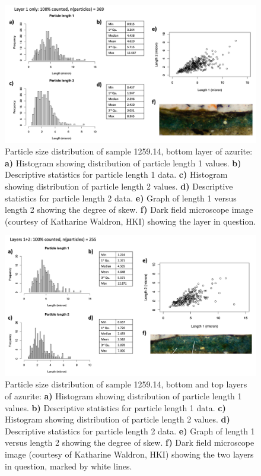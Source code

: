 \begin{figure}[H]
\centering
  \includegraphics[width=\linewidth]{1259-14_partsize_1}
\caption[Particle size distribution, sample 1259.14 bottom layer.]{Particle size distribution of sample 1259.14, bottom layer of azurite: \textbf{a)} Histogram showing distribution of particle length 1 values. \textbf{b)} Descriptive statistics for particle length 1 data. \textbf{c)} Histogram showing distribution of particle length 2 values. \textbf{d)} Descriptive statistics for particle length 2 data. \textbf{e)} Graph of length 1 versus length 2 showing the degree of skew. \textbf{f)} Dark field microscope image (courtesy of Katharine Waldron, HKI) showing the layer in question.}
\label{fig:1259.14_partsize_1}
\end{figure}

\begin{figure}[H]
\centering
  \includegraphics[width=\linewidth]{1259-14_partsize_2}
\caption[Particle size distribution, sample 1259.14 bottom and top layers.]{Particle size distribution of sample 1259.14, bottom and top layers of azurite: \textbf{a)} Histogram showing distribution of particle length 1 values. \textbf{b)} Descriptive statistics for particle length 1 data. \textbf{c)} Histogram showing distribution of particle length 2 values. \textbf{d)} Descriptive statistics for particle length 2 data. \textbf{e)} Graph of length 1 versus length 2 showing the degree of skew. \textbf{f)} Dark field microscope image (courtesy of Katharine Waldron, HKI) showing the two layers in question, marked by white lines.}
\label{fig:1259.14_partsize_2}
\end{figure}


